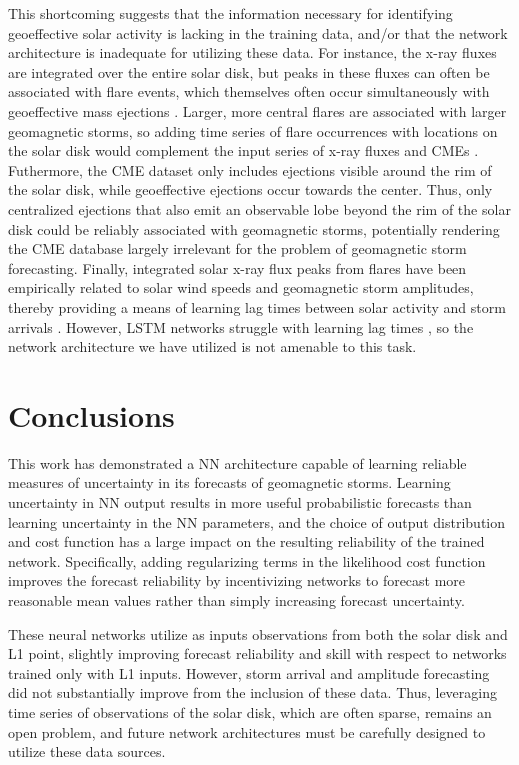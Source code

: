 \documentclass[draft,linenumbers]{agujournal2018}
\begin{document}
This shortcoming suggests that the information necessary for identifying geoeffective solar activity is lacking in the training data, and/or that the network architecture is inadequate for utilizing these data. For instance, the x-ray fluxes are integrated over the entire solar disk, but peaks in these fluxes can often be associated with flare events, which themselves often occur simultaneously with geoeffective mass ejections \citep{Tobiska2013}. Larger, more central flares are associated with larger geomagnetic storms, so adding time series of flare occurrences with locations on the solar disk would complement the input series of x-ray fluxes and CMEs \citep{Tobiska2013}. Futhermore, the CME dataset only includes ejections visible around the rim of the solar disk, while geoeffective ejections occur towards the center. Thus, only centralized ejections that also emit an observable lobe beyond the rim of the solar disk could be reliably associated with geomagnetic storms, potentially rendering the CME database largely irrelevant for the problem of geomagnetic storm forecasting. Finally, integrated solar x-ray flux peaks from flares have been empirically related to solar wind speeds and geomagnetic storm amplitudes, thereby providing a means of learning lag times between solar activity and storm arrivals \citep{Tobiska2013}. However, LSTM networks struggle with learning lag times \citep{Gers2002}, so the network architecture we have utilized is not amenable to this task.  

\section{Conclusions}
% 
This work has demonstrated a NN architecture capable of learning reliable measures of uncertainty in its forecasts of geomagnetic storms. Learning uncertainty in NN output results in more useful probabilistic forecasts than learning uncertainty in the NN parameters, and the choice of output distribution and cost function has a large impact on the resulting reliability of the trained network. Specifically, adding regularizing terms in the likelihood cost function improves the forecast reliability by incentivizing networks to forecast more reasonable mean values rather than simply increasing forecast uncertainty.

These neural networks utilize as inputs observations from both the solar disk and L1 point, slightly improving forecast reliability and skill with respect to networks trained only with L1 inputs. However, storm arrival and amplitude forecasting did not substantially improve from the inclusion of these data. Thus, leveraging time series of observations of the solar disk, which are often sparse, remains an open problem, and future network architectures must be carefully designed to utilize these data sources. 
\end{document}
